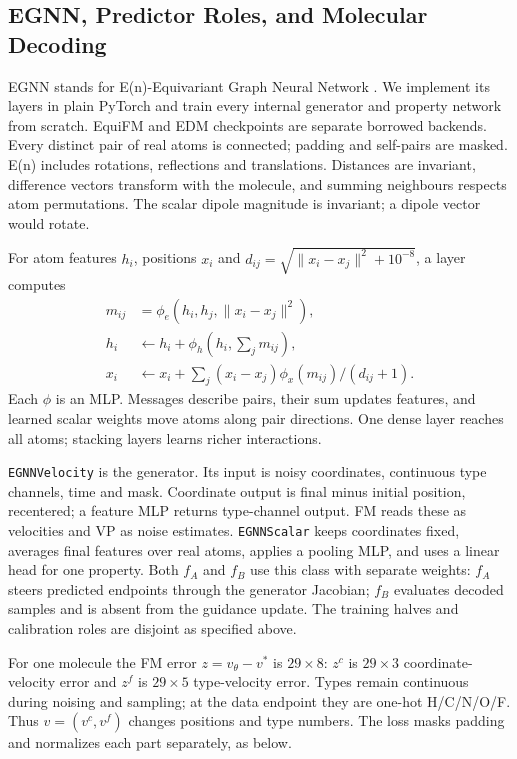 \documentclass{article}
\begin{document}
\subsection{EGNN, Predictor Roles, and Molecular Decoding}\label{app:egnn}
EGNN stands for E(n)-Equivariant Graph Neural Network \citep{satorras2021egnn}. We implement its layers in plain PyTorch and train every internal generator and property network from scratch. EquiFM and EDM checkpoints are separate borrowed backends. Every distinct pair of real atoms is connected; padding and self-pairs are masked. E(n) includes rotations, reflections and translations. Distances are invariant, difference vectors transform with the molecule, and summing neighbours respects atom permutations. The scalar dipole magnitude is invariant; a dipole vector would rotate.

For atom features $h_i$, positions $x_i$ and $d_{ij}=\sqrt{\|x_i-x_j\|^2+10^{-8}}$, a layer computes
\begin{align*}
m_{ij}&=\phi_e(h_i,h_j,\|x_i-x_j\|^2),\\
h_i&\leftarrow h_i+\phi_h(h_i,\sum_j m_{ij}),\\
x_i&\leftarrow x_i+\sum_j (x_i-x_j)\phi_x(m_{ij})/(d_{ij}+1).
\end{align*}
Each $\phi$ is an MLP. Messages describe pairs, their sum updates features, and learned scalar weights move atoms along pair directions. One dense layer reaches all atoms; stacking layers learns richer interactions.

\texttt{EGNNVelocity} is the generator. Its input is noisy coordinates, continuous type channels, time and mask. Coordinate output is final minus initial position, recentered; a feature MLP returns type-channel output. FM reads these as velocities and VP as noise estimates. \texttt{EGNNScalar} keeps coordinates fixed, averages final features over real atoms, applies a pooling MLP, and uses a linear head for one property. Both $f_A$ and $f_B$ use this class with separate weights: $f_A$ steers predicted endpoints through the generator Jacobian; $f_B$ evaluates decoded samples and is absent from the guidance update. The training halves and calibration roles are disjoint as specified above.

For one molecule the FM error $z=v_\theta-v^*$ is $29\times8$: $z^c$ is $29\times3$ coordinate-velocity error and $z^f$ is $29\times5$ type-velocity error. Types remain continuous during noising and sampling; at the data endpoint they are one-hot H/C/N/O/F. Thus $v=(v^c,v^f)$ changes positions and type numbers. The loss masks padding and normalizes each part separately, as below.
\end{document}
